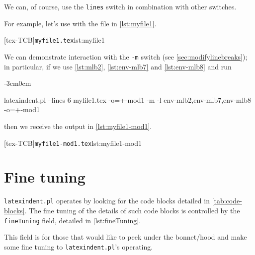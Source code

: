 \documentclass[10pt]{article}
\newenvironment{widepage}{\begin{adjustwidth}{-3cm}{0cm}}{\end{adjustwidth}}
\begin{document}
 \begin{example}
 We can, of course, use the \texttt{lines} switch in combination with other switches.

 For example, let's use with the file in \cref{lst:myfile1}.

 [tex-TCB]{\texttt{myfile1.tex}}{lst:myfile1}

 We can demonstrate interaction with the \texttt{-m} switch (see
 \vref{sec:modifylinebreaks}); in particular, if we use \vref{lst:mlb2},
 \vref{lst:env-mlb7} and \vref{lst:env-mlb8} and run
 \begin{widepage}

  \begin{commandshell}
latexindent.pl --lines 6 myfile1.tex -o=+-mod1 -m -l env-mlb2,env-mlb7,env-mlb8 -o=+-mod1
     \end{commandshell}

 \end{widepage}
 then we receive the output in \cref{lst:myfile1-mod1}.

 [tex-TCB]{\texttt{myfile1-mod1.tex}}{lst:myfile1-mod1}
 \end{example}
\section{Fine tuning}\label{sec:finetuning}
 \texttt{latexindent.pl} operates by looking for the code blocks detailed in
 \vref{tab:code-blocks}.
  The fine tuning of the
 details of such code blocks is controlled by the \texttt{fineTuning} field, detailed in
 \cref{lst:fineTuning}.

 This field is for those that would like to peek under the bonnet/hood and make some fine
 tuning to \texttt{latexindent.pl}'s operating. 
  
      
      
\end{document}
